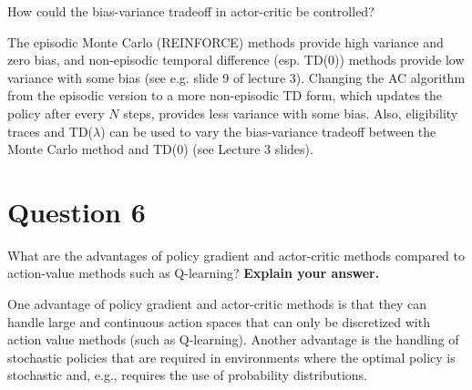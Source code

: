 \documentclass[12pt]{article}
\begin{document}
How could the bias-variance tradeoff in actor-critic be controlled?
\newline

The episodic Monte Carlo (REINFORCE) methods provide high variance and zero bias, and non-episodic temporal difference (esp. TD(0)) methods provide low variance with some bias (see e.g. slide 9 of lecture 3). 
Changing the AC algorithm from the episodic version to a more non-episodic TD form, which updates the policy after every $N$ steps, provides less variance with some bias. 
Also, eligibility traces and TD($\lambda$) can be used to vary the bias-variance tradeoff between the Monte Carlo method and TD(0) (see Lecture 3 slides).  


\section*{Question 6}

What are the advantages of policy gradient and actor-critic methods
compared to action-value methods such as Q-learning? \textbf{Explain your answer.}
\newline

One advantage of policy gradient and actor-critic methods is that they can handle large and continuous action spaces that can only be discretized with action value methods (such as Q-learning).
Another advantage is the handling of stochastic policies that are required in environments where the optimal policy is stochastic and, e.g., requires the use of probability distributions.


\nocite{*}



\end{document}
